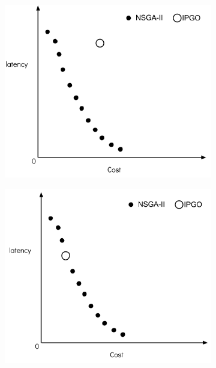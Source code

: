\documentclass[twoside]{article}
\begin{document}
\begin{figure}[H]
	\centering
	\begin{subfigure}[b]{0.4\textwidth}
		\includegraphics[width=\textwidth]{pics/1.png}
		\caption{}
	\end{subfigure}%
	\begin{subfigure}[b]{0.4\textwidth}
		\includegraphics[width=\textwidth]{pics/2.png}
		\caption{}
	\end{subfigure}



\end{figure}
\end{document}
